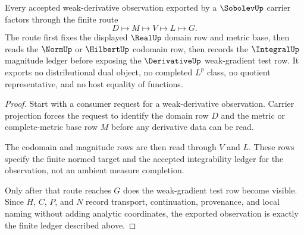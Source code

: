 \begin{theorem}
\label{thm:sobolev-weak-derivative-ledger}
Every accepted weak-derivative observation exported by a $\SobolevUp$ carrier factors through the finite route
$$
D \longmapsto M \longmapsto V \longmapsto L \longmapsto G.
$$
The route first fixes the displayed $\RealUp$ domain row and metric base, then reads the $\NormUp$ or $\HilbertUp$ codomain row, then records the $\IntegralUp$ magnitude ledger before exposing the $\DerivativeUp$ weak-gradient test row. It exports no distributional dual object, no completed $L^p$ class, no quotient representative, and no host equality of functions.
\end{theorem}
\begin{proof}
Start with a consumer request for a weak-derivative observation. Carrier projection forces the request to identify the domain row $D$ and the metric or complete-metric base row $M$ before any derivative data can be read.

The codomain and magnitude rows are then read through $V$ and $L$. These rows specify the finite normed target and the accepted integrability ledger for the observation, not an ambient measure completion.

Only after that route reaches $G$ does the weak-gradient test row become visible. Since $H$, $C$, $P$, and $N$ record transport, continuation, provenance, and local naming without adding analytic coordinates, the exported observation is exactly the finite ledger described above.
\end{proof}


